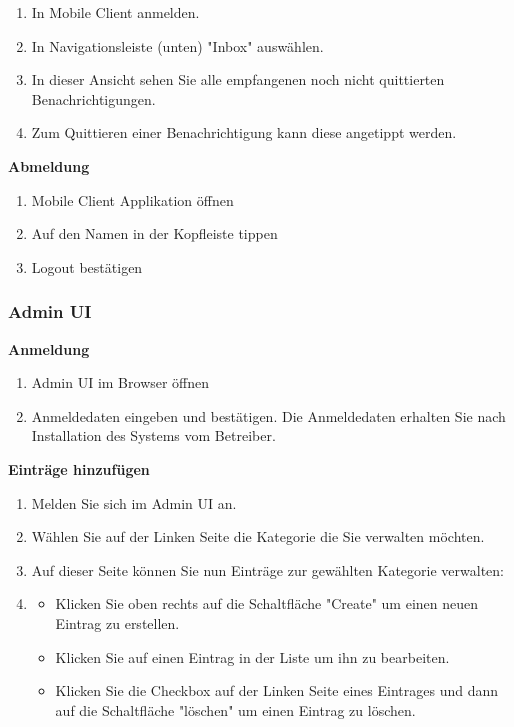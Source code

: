         \begin{enumerate}
            \item In Mobile Client anmelden.
            \item In Navigationsleiste (unten) "Inbox" auswählen.
            \item In dieser Ansicht sehen Sie alle empfangenen noch nicht quittierten Benachrichtigungen.
            \item Zum Quittieren einer Benachrichtigung kann diese angetippt werden.
        \end{enumerate}

        \textbf{Abmeldung}

        \begin{enumerate}
            \item Mobile Client Applikation öffnen
            \item Auf den Namen in der Kopfleiste tippen
            \item Logout bestätigen
        \end{enumerate}

        \subsubsection*{Admin UI}

        \textbf{Anmeldung}

        \begin{enumerate}
            \item Admin UI im Browser öffnen
            \item Anmeldedaten eingeben und bestätigen. Die Anmeldedaten erhalten Sie nach Installation des Systems vom Betreiber.
        \end{enumerate}

        \textbf{Einträge hinzufügen}
        \begin{enumerate}
            \item Melden Sie sich im Admin UI an.
            \item Wählen Sie auf der Linken Seite die Kategorie die Sie verwalten möchten.
            \item Auf dieser Seite können Sie nun Einträge zur gewählten Kategorie verwalten:
            \item \begin{itemize}
                      \item Klicken Sie oben rechts auf die Schaltfläche "Create" um einen neuen Eintrag zu erstellen.
                      \item Klicken Sie auf einen Eintrag in der Liste um ihn zu bearbeiten.
                      \item Klicken Sie die Checkbox auf der Linken Seite eines Eintrages und dann auf die Schaltfläche "löschen" um einen Eintrag zu löschen.
            \end{itemize}
        \end{enumerate}

